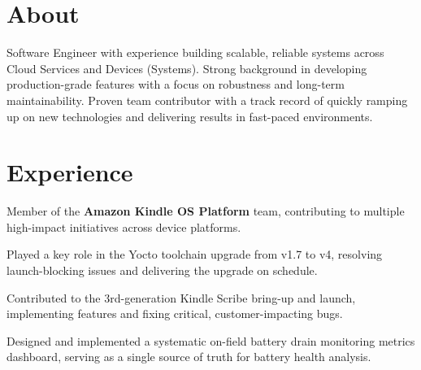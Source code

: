 \documentclass[11pt]{plushcv}
\begin{document}


\vspace{5pt}


\section{About}
\fontsize{11.5pt}{14pt}\selectfont %
Software Engineer with experience building scalable, reliable systems across Cloud Services and Devices (Systems). Strong background in developing production-grade features with a focus on robustness and long-term maintainability. Proven team contributor with a track record of quickly ramping up on new technologies and delivering results in fast-paced environments. 

\sectionsep

\section{Experience}
\fontsize{11.5pt}{13.5pt}\selectfont %

\begin{tightemize}
\item Member of the \textbf{Amazon Kindle OS Platform} team, contributing to multiple high-impact initiatives across device platforms. 
\item Played a key role in the Yocto toolchain upgrade from v1.7 to v4, resolving launch-blocking issues and delivering the upgrade on schedule. 
\item Contributed to the 3rd-generation Kindle Scribe bring-up and launch, implementing features and fixing critical, customer-impacting bugs. 
\item Designed and implemented a systematic on-field battery drain monitoring metrics dashboard, serving as a single source of truth for battery health analysis. 
\end{tightemize}
\end{document}
